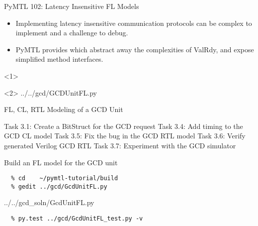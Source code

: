 \begin{frame}{PyMTL 102: Latency Insensitive FL Models}
\begin{itemize}
  \item Implementing latency insensitive communication protocols can be
        complex to implement and a challenge to debug.
  \smallskip
  \item PyMTL provides  which abstract away the
        complexities of ValRdy, and expose simplified method interfaces.
\end{itemize}

  \begin{onlyenv}<1>
  \end{onlyenv}

  \begin{onlyenv}<2>
  \vspace{-0.15in}
  {../../gcd/GCDUnitFL.py}
  \end{onlyenv}

\end{frame}


\begin{frame}{ FL, CL, RTL Modeling of a GCD Unit}
\begin{cbxlist}
  \1 Task 3.1: Create a BitStruct for the GCD request
  \1 
  \1 
  \1 Task 3.4: Add timing to the GCD CL model
  \1 Task 3.5: Fix the bug in the GCD RTL model
  \1 Task 3.6: Verify generated Verilog GCD RTL
  \1 Task 3.7: Experiment with the GCD simulator
\end{cbxlist}
\end{frame}

\begin{task}\begin{frame}[fragile]{Build an FL model for the GCD unit}
\vspace{-0.25in}
\begin{verbatim}
  % cd    ~/pymtl-tutorial/build
  % gedit ../gcd/GcdUnitFL.py
\end{verbatim}

%
{../../gcd_soln/GcdUnitFL.py}

\begin{verbatim}
  % py.test ../gcd/GcdUnitFL_test.py -v
\end{verbatim}
\end{frame}
\end{task}

